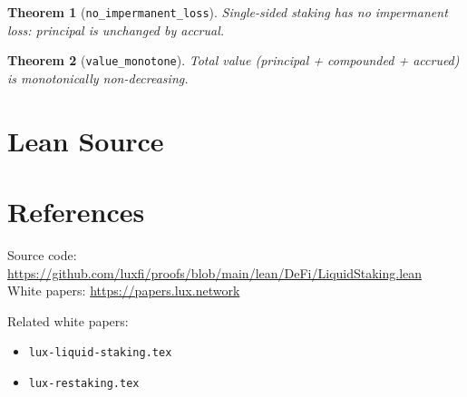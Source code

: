 \documentclass[11pt]{article}
\newtheorem{theorem}{Theorem}
\begin{document}
\begin{theorem}[\texttt{no\_impermanent\_loss}]
Single-sided staking has no impermanent loss: principal is unchanged by accrual.
\end{theorem}

\begin{theorem}[\texttt{value\_monotone}]
Total value (principal + compounded + accrued) is monotonically non-decreasing.
\end{theorem}


\section{Lean Source}


\section{References}
\noindent Source code: \url{https://github.com/luxfi/proofs/blob/main/lean/DeFi/LiquidStaking.lean}\\
\noindent White papers: \url{https://papers.lux.network}

\noindent Related white papers:
\begin{itemize}
  \item \texttt{lux-liquid-staking.tex}
  \item \texttt{lux-restaking.tex}
\end{itemize}
\end{document}

